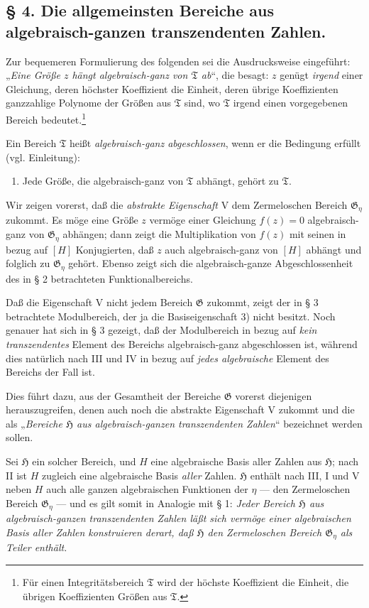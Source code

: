 \documentclass[11pt]{article}
\begin{document}
\subsection*{§ 4. Die allgemeinsten Bereiche aus algebraisch-ganzen
transzendenten Zahlen.}

Zur bequemeren Formulierung des folgenden sei die Ausdrucksweise eingeführt:
„\emph{Eine Größe $z$ hängt algebraisch-ganz von $\mathfrak T$ ab}“, die besagt:
$z$ genügt \emph{irgend} einer Gleichung, deren höchster Koeffizient die Einheit,
deren übrige Koeffizienten ganzzahlige Polynome der Größen aus $\mathfrak T$
sind, wo $\mathfrak T$ irgend einen vorgegebenen Bereich bedeutet.\footnote{Für
einen Integritätsbereich $\mathfrak T$ wird der höchste Koeffizient die Einheit,
die übrigen Koeffizienten Größen aus $\mathfrak T$.}

Ein Bereich $\mathfrak T$ heißt \emph{algebraisch-ganz abgeschlossen}, wenn er
die Bedingung erfüllt (vgl. Einleitung):
\begin{enumerate}
\item[V.] Jede Größe, die algebraisch-ganz von $\mathfrak T$ abhängt, gehört zu
$\mathfrak T$.
\end{enumerate}

Wir zeigen vorerst, daß die \emph{abstrakte Eigenschaft} V dem Zermeloschen
Bereich $\mathfrak G_\eta$ zukommt. Es möge eine Größe $z$ vermöge einer
Gleichung $f(z)=0$ algebraisch-ganz von $\mathfrak G_\eta$ abhängen; dann zeigt
die Multiplikation von $f(z)$ mit seinen in bezug auf $[H]$ Konjugierten, daß
$z$ auch algebraisch-ganz von $[H]$ abhängt und folglich zu $\mathfrak G_\eta$
gehört. Ebenso zeigt sich die algebraisch-ganze Abgeschlossenheit des in § 2
betrachteten Funktionalbereichs.

Daß die Eigenschaft V nicht jedem Bereich $\mathfrak G$ zukommt, zeigt der in
§ 3 betrachtete Modulbereich, der ja die Basiseigenschaft 3) nicht besitzt. Noch
genauer hat sich in § 3 gezeigt, daß der Modulbereich in bezug auf \emph{kein
transzendentes} Element des Bereichs algebraisch-ganz abgeschlossen ist, während
dies natürlich nach III und IV in bezug auf \emph{jedes algebraische} Element des
Bereichs der Fall ist.

Dies führt dazu, aus der Gesamtheit der Bereiche $\mathfrak G$ vorerst
diejenigen herauszugreifen, denen auch noch die abstrakte Eigenschaft V zukommt
und die als „\emph{Bereiche $\mathfrak H$ aus algebraisch-ganzen
transzendenten Zahlen}“ bezeichnet werden sollen.

Sei $\mathfrak H$ ein solcher Bereich, und $H$ eine algebraische Basis aller
Zahlen aus $\mathfrak H$; nach II ist $H$ zugleich eine algebraische Basis
\emph{aller} Zahlen. $\mathfrak H$ enthält nach III, I und V neben $H$ auch alle
ganzen algebraischen Funktionen der $\eta$ --- den Zermeloschen Bereich
$\mathfrak G_\eta$ --- und es gilt somit in Analogie mit § 1: \emph{Jeder
Bereich $\mathfrak H$ aus algebraisch-ganzen transzendenten Zahlen läßt sich
vermöge einer algebraischen Basis aller Zahlen konstruieren derart, daß
$\mathfrak H$ den Zermeloschen Bereich $\mathfrak G_\eta$ als Teiler enthält.}
\end{document}
